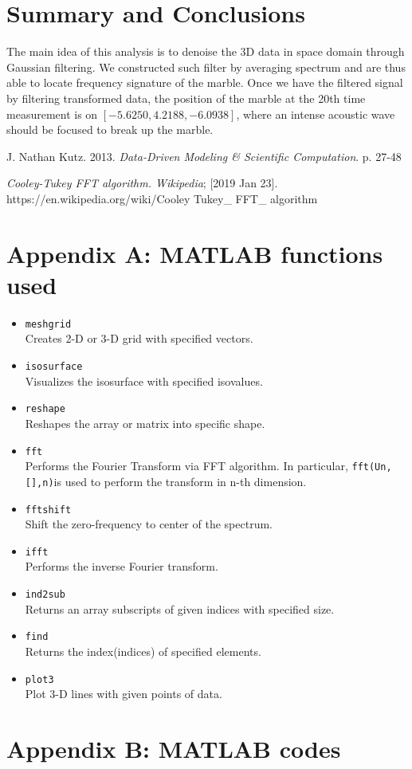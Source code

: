 \documentclass[11pt,a4paper]{article}
\numberwithin{equation}{subsection}
\begin{document}
\section{Summary and Conclusions}
The main idea of this analysis is to denoise the 3D data in space domain through Gaussian filtering. We constructed such filter by averaging spectrum and are thus able to locate frequency signature of the marble. Once we have the filtered signal by filtering transformed data, the position of the marble at the 20th time measurement is on $[-5.6250, 4.2188, -6.0938]$, where an intense acoustic wave should be focused to break up the marble.


\begin{thebibliography}{11}
	J. Nathan Kutz. 2013.
	\textit{Data-Driven Modeling \& Scientific Computation}. p. 27-48
	
	\textit{Cooley-Tukey FFT algorithm. Wikipedia}; [2019 Jan 23]. \\https://en.wikipedia.org/wiki/Cooley\- Tukey\_ FFT\_ algorithm
\end{thebibliography}

\pagebreak
\section*{Appendix A: MATLAB functions used}
	\begin{itemize}
		\item \lstinline{meshgrid}\\ Creates 2-D or 3-D grid with specified vectors.
		\item \lstinline{isosurface}\\ Visualizes the isosurface with specified isovalues.
		\item \lstinline{reshape}\\Reshapes the array or matrix into specific shape.
		\item \lstinline{fft}\\Performs the Fourier Transform via FFT algorithm. In particular, \lstinline{fft(Un,[],n)}is used to perform the transform in n-th dimension.
		\item \lstinline{fftshift}\\ Shift the zero-frequency to center of the spectrum.
		\item \lstinline{ifft}\\ Performs the inverse Fourier transform.
		\item \lstinline{ind2sub}\\ Returns an array subscripts of given indices with specified size.
		\item \lstinline{find}\\ Returns the index(indices) of specified elements.
		\item \lstinline{plot3}\\ Plot 3-D lines with given points of data.
	\end{itemize}

\section*{Appendix B: MATLAB codes}

\end{document}
